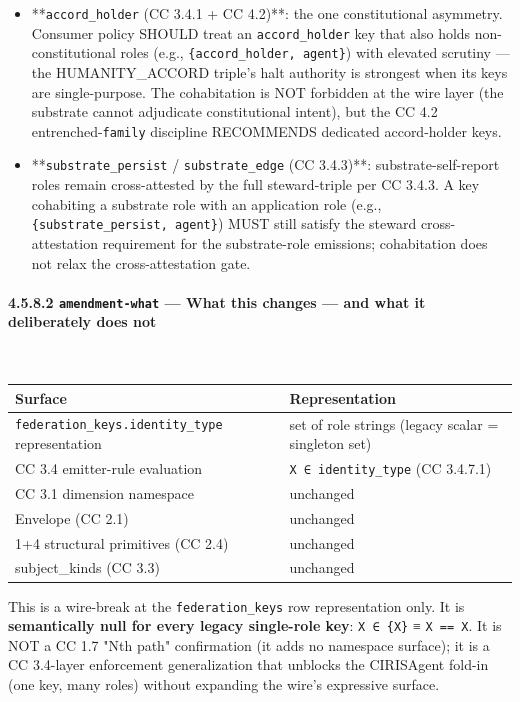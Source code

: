 \documentclass[11pt]{article}
\begin{document}
\begin{itemize}\setlength\itemsep{0pt}
\item **\texttt{accord\_holder} (CC 3.4.1 + CC 4.2)**: the one constitutional asymmetry. Consumer policy SHOULD treat an \texttt{accord\_holder} key that also holds non-constitutional roles (e.g., \texttt{\{accord\_holder, agent\}}) with elevated scrutiny — the HUMANITY\_ACCORD triple's halt authority is strongest when its keys are single-purpose. The cohabitation is NOT forbidden at the wire layer (the substrate cannot adjudicate constitutional intent), but the CC 4.2 entrenched-\texttt{family} discipline RECOMMENDS dedicated accord-holder keys.
\item **\texttt{substrate\_persist} / \texttt{substrate\_edge} (CC 3.4.3)**: substrate-self-report roles remain cross-attested by the full steward-triple per CC 3.4.3. A key cohabiting a substrate role with an application role (e.g., \texttt{\{substrate\_persist, agent\}}) MUST still satisfy the steward cross-attestation requirement for the substrate-role emissions; cohabitation does not relax the cross-attestation gate.
\end{itemize}


\paragraph{4.5.8.2 \texttt{amendment-what} — What this changes — and what it deliberately does not}\mbox{}\\


{\footnotesize
\begin{longtable}{|p{8.0cm}|p{8.0cm}|}\hline
\textbf{Surface} & \textbf{Representation} \\ \hline\endhead
\texttt{federation\_keys.identity\_type} representation & set of role strings (legacy scalar = singleton set) \\ \hline
CC 3.4 emitter-rule evaluation & \texttt{X ∈ identity\_type} (CC 3.4.7.1) \\ \hline
CC 3.1 dimension namespace & unchanged \\ \hline
Envelope (CC 2.1) & unchanged \\ \hline
1+4 structural primitives (CC 2.4) & unchanged \\ \hline
subject\_kinds (CC 3.3) & unchanged \\ \hline
\end{longtable}}


This is a wire-break at the \texttt{federation\_keys} row representation only. It is \textbf{semantically null for every legacy single-role key}: \texttt{X ∈ \{X\}} ≡ \texttt{X == X}. It is NOT a CC 1.7 "Nth path" confirmation (it adds no namespace surface); it is a CC 3.4-layer enforcement generalization that unblocks the CIRISAgent fold-in (one key, many roles) without expanding the wire's expressive surface.
\end{document}
